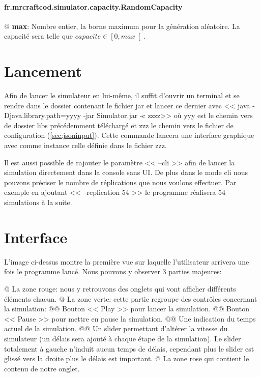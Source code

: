 \documentclass[final]{polytech/polytech}
\begin{document}
				\paragraph{fr.mrcraftcod.simulator.capacity.RandomCapacity}
					\begin{easylist}[itemize]
						@ \textbf{max}: Nombre entier, la borne maximum pour la génération aléatoire. La capacité sera telle que $capacite\in\left[0, max\right[$.
					\end{easylist}
				
	\section{Lancement}
		Afin de lancer le simulateur en lui-même, il suffit d'ouvrir un terminal et se rendre dans le dossier contenant le fichier jar et lancer ce dernier avec << java -Djava.library.path=yyyy -jar Simulator.jar -c zzzz>> où yyy est le chemin vers de dossier libs précédemment téléchargé et zzz le chemin vers le fichier de configuration (\autoref{sec:jsoninput}).
		Cette commande lancera une interface graphique avec comme instance celle définie dans le fichier zzz.
	
		Il est aussi possible de rajouter le paramètre << --cli >> afin de lancer la simulation directement dans la console sans UI.
		De plus dans le mode cli nous pouvons préciser le nombre de réplications que nous voulons effectuer. Par exemple en ajoutant << --replication 54 >> le programme réalisera 54 simulations à la suite. 
	
	\section{Interface}
		
		L'image ci-dessus montre la première vue sur laquelle l'utilisateur arrivera une fois le programme lancé.
		Nous pouvons y observer 3 parties majeures:
		\begin{easylist}
			@ La zone rouge: nous y retrouvons des onglets qui vont afficher différents éléments chacun.
			@ La zone verte: cette partie regroupe des contrôles concernant la simulation:
			@@ Bouton << Play >> pour lancer la simulation.
			@@ Bouton << Pause >> pour mettre en pause la simulation.
			@@ Une indication du temps actuel de la simulation.
			@@ Un slider permettant d'altérer la vitesse du simulateur (un délais sera ajouté à chaque étape de la simulation). Le slider totalement à gauche n'induit aucun temps de délais, cependant plus le slider est glissé vers la droite plus le délais est important.
			@ La zone rose qui contient le contenu de notre onglet.
		\end{easylist}
		
\end{document}
